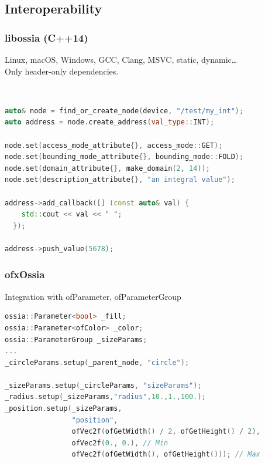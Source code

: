 \documentclass[handout]{beamer}
\begin{document}
\subsection{Interoperability}

\begin{frame}[fragile]
\frametitle{libossia (C++14)}
Linux, macOS, Windows, GCC, Clang, MSVC, static, dynamic\dots
~\\
Only header-only dependencies.

~\\
\footnotesize
\begin{lstlisting}[language=C++]
auto& node = find_or_create_node(device, "/test/my_int");
auto address = node.create_address(val_type::INT);

node.set(access_mode_attribute{}, access_mode::GET);
node.set(bounding_mode_attribute{}, bounding_mode::FOLD);
node.set(domain_attribute{}, make_domain(2, 14));
node.set(description_attribute{}, "an integral value");

address->add_callback([] (const auto& val) {
    std::cout << val << " ";
  });

address->push_value(5678);
\end{lstlisting}
\end{frame}

\begin{frame}[fragile]
\frametitle{ofxOssia}
\Large Integration with ofParameter, ofParameterGroup
~\\
\footnotesize
\begin{lstlisting}[language=C++]
ossia::Parameter<bool> _fill;
ossia::Parameter<ofColor> _color;
ossia::ParameterGroup _sizeParams;
...
_circleParams.setup(_parent_node, "circle");

_sizeParams.setup(_circleParams, "sizeParams");
_radius.setup(_sizeParams,"radius",10.,1.,100.);
_position.setup(_sizeParams,
                "position",
                ofVec2f(ofGetWidth() / 2, ofGetHeight() / 2),
                ofVec2f(0., 0.), // Min
                ofVec2f(ofGetWidth(), ofGetHeight())); // Max
\end{lstlisting}
\end{frame}
\end{document}
